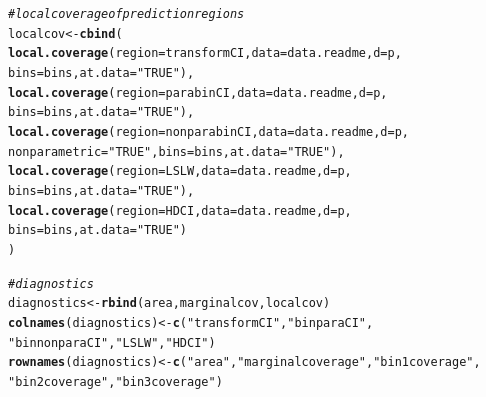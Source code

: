 \documentclass[11pt]{article}\usepackage[]{graphicx}\usepackage[]{color}
\makeatletter
\newcommand{\hlstr}[1]{\textcolor[rgb]{0.192,0.494,0.8}{#1}}%
\newcommand{\hlcom}[1]{\textcolor[rgb]{0.678,0.584,0.686}{\textit{#1}}}%
\newcommand{\hlstd}[1]{\textcolor[rgb]{0.345,0.345,0.345}{#1}}%
\newcommand{\hlkwb}[1]{\textcolor[rgb]{0.69,0.353,0.396}{#1}}%
\newcommand{\hlkwc}[1]{\textcolor[rgb]{0.333,0.667,0.333}{#1}}%
\newcommand{\hlkwd}[1]{\textcolor[rgb]{0.737,0.353,0.396}{\textbf{#1}}}%
\newenvironment{kframe}{%
 \def\at@end@of@kframe{}%
 \ifinner\ifhmode%
  \def\at@end@of@kframe{\end{minipage}}%
  \begin{minipage}{\columnwidth}%
 \fi\fi%
 \def\FrameCommand##1{\hskip\@totalleftmargin \hskip-\fboxsep
 \colorbox{shadecolor}{##1}\hskip-\fboxsep
     \hskip-\linewidth \hskip-\@totalleftmargin \hskip\columnwidth}%
 \MakeFramed {\advance\hsize-\width
   \@totalleftmargin\z@ \linewidth\hsize
   \@setminipage}}%
 {\par\unskip\endMakeFramed%
 \at@end@of@kframe}
\newenvironment{knitrout}{}{} %
\makeatother
\begin{document}
\begin{knitrout}
\begin{kframe}
\begin{alltt}
\hlcom{# local coverage of prediction regions}
\hlstd{localcov} \hlkwb{<-} \hlkwd{cbind}\hlstd{(}
  \hlkwd{local.coverage}\hlstd{(}\hlkwc{region} \hlstd{= transformCI,} \hlkwc{data} \hlstd{= data.readme,} \hlkwc{d} \hlstd{= p,}
    \hlkwc{bins} \hlstd{= bins,} \hlkwc{at.data} \hlstd{=} \hlstr{"TRUE"}\hlstd{),}
  \hlkwd{local.coverage}\hlstd{(}\hlkwc{region} \hlstd{= parabinCI,} \hlkwc{data} \hlstd{= data.readme,} \hlkwc{d} \hlstd{= p,}
    \hlkwc{bins} \hlstd{= bins,} \hlkwc{at.data} \hlstd{=} \hlstr{"TRUE"}\hlstd{),}
  \hlkwd{local.coverage}\hlstd{(}\hlkwc{region} \hlstd{= nonparabinCI,} \hlkwc{data} \hlstd{= data.readme,} \hlkwc{d} \hlstd{= p,}
    \hlkwc{nonparametric} \hlstd{=} \hlstr{"TRUE"}\hlstd{,} \hlkwc{bins} \hlstd{= bins,} \hlkwc{at.data} \hlstd{=} \hlstr{"TRUE"}\hlstd{),}
  \hlkwd{local.coverage}\hlstd{(}\hlkwc{region} \hlstd{= LSLW,} \hlkwc{data} \hlstd{= data.readme,} \hlkwc{d} \hlstd{= p,}
    \hlkwc{bins} \hlstd{= bins,} \hlkwc{at.data} \hlstd{=} \hlstr{"TRUE"}\hlstd{),}
  \hlkwd{local.coverage}\hlstd{(}\hlkwc{region} \hlstd{= HDCI,} \hlkwc{data} \hlstd{= data.readme,} \hlkwc{d} \hlstd{= p,}
    \hlkwc{bins} \hlstd{= bins,} \hlkwc{at.data} \hlstd{=} \hlstr{"TRUE"}\hlstd{)}
\hlstd{)}

\hlcom{# diagnostics}
\hlstd{diagnostics} \hlkwb{<-} \hlkwd{rbind}\hlstd{(area, marginalcov, localcov)}
\hlkwd{colnames}\hlstd{(diagnostics)} \hlkwb{<-} \hlkwd{c}\hlstd{(}\hlstr{"transformCI"}\hlstd{,} \hlstr{"binparaCI"}\hlstd{,}
  \hlstr{"binnonparaCI"}\hlstd{,} \hlstr{"LSLW"}\hlstd{,} \hlstr{"HDCI"}\hlstd{)}
\hlkwd{rownames}\hlstd{(diagnostics)} \hlkwb{<-} \hlkwd{c}\hlstd{(}\hlstr{"area"}\hlstd{,} \hlstr{"marginal coverage"}\hlstd{,} \hlstr{"bin 1 coverage"}\hlstd{,}
  \hlstr{"bin 2 coverage"}\hlstd{,} \hlstr{"bin 3 coverage"}\hlstd{)}
\end{alltt}
\end{kframe}
\end{knitrout}
\end{document}
